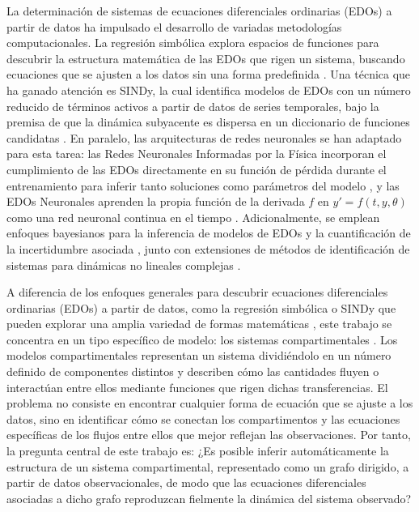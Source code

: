 La determinación de sistemas de ecuaciones diferenciales ordinarias (EDOs) a partir de datos ha impulsado el desarrollo de variadas metodologías 
computacionales. La regresión simbólica explora espacios de funciones para descubrir la estructura matemática de las EDOs que rigen un 
sistema, buscando ecuaciones que se ajusten a los datos sin una forma predefinida \cite{schmidt2009}. Una técnica que ha ganado atención es SINDy, 
la cual identifica modelos de EDOs con un número reducido de términos activos a partir de datos de series 
temporales, bajo la premisa de que la dinámica subyacente es dispersa en un diccionario de funciones candidatas \cite{brunton2016sindy}. En paralelo, 
las arquitecturas de redes neuronales se han adaptado para esta tarea: las Redes Neuronales Informadas por la Física incorporan el cumplimiento de las 
EDOs directamente en su función de pérdida durante el entrenamiento para inferir tanto soluciones como parámetros del modelo 
\cite{raissi2019pinn}, y las EDOs Neuronales aprenden la propia función de la derivada $f$ en $y' = f(t,y,\theta)$ como una red neuronal continua 
en el tiempo \cite{chen2018neuralode}. Adicionalmente, se emplean enfoques bayesianos para la inferencia de modelos de EDOs y la cuantificación de la 
incertidumbre asociada \cite{girolami2011bayesian}, junto con extensiones de métodos de identificación de sistemas para dinámicas no lineales complejas 
\cite{nelles2020nonlinear}.

A diferencia de los enfoques generales para descubrir ecuaciones di\-fe\-ren\-cia\-les ordinarias (EDOs) a partir de datos, como la regresión simbólica o SINDy 
que pueden explorar una amplia variedad de formas matemáticas \cite{brunton2016sindy}, este trabajo se concentra en un tipo específico de modelo: 
los sistemas compartimentales \cite{godfrey1983}. Los modelos compartimentales representan un sistema dividiéndolo en un número definido de componentes 
distintos y des\-cri\-ben cómo las cantidades fluyen o interactúan entre ellos mediante funciones que rigen dichas transferencias. 
El problema no consiste en encontrar cualquier forma de ecuación que se ajuste a los datos, 
sino en identificar cómo se conectan los compartimentos y las ecuaciones específicas de los flujos 
entre ellos que mejor reflejan las observaciones. Por tanto, la pregunta central de este trabajo es:
¿Es posible inferir automáticamente la estructura de un sistema compartimental, representado como un grafo dirigido, a partir de datos observacionales, 
de modo que las ecuaciones diferenciales asociadas a dicho grafo reproduzcan fielmente la dinámica del sistema observado?

